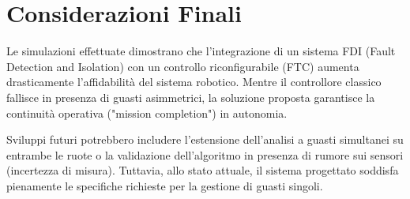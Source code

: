 \section{Considerazioni Finali}
Le simulazioni effettuate dimostrano che l'integrazione di un sistema FDI (Fault Detection and Isolation) con un controllo riconfigurabile (FTC) aumenta drasticamente l'affidabilità del sistema robotico.
Mentre il controllore classico fallisce in presenza di guasti asimmetrici, la soluzione proposta garantisce la continuità operativa ("mission completion") in autonomia.

Sviluppi futuri potrebbero includere l'estensione dell'analisi a guasti simultanei su entrambe le ruote o la validazione dell'algoritmo in presenza di rumore sui sensori (incertezza di misura). Tuttavia, allo stato attuale, il sistema progettato soddisfa pienamente le specifiche richieste per la gestione di guasti singoli.